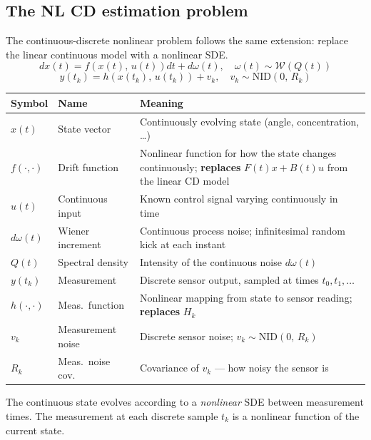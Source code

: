 \documentclass[12pt, a4paper]{article}
\begin{document}
\subsection*{The NL CD estimation problem}

The continuous-discrete nonlinear problem follows the same extension:
replace the linear continuous model with a nonlinear SDE.
\[
  dx(t) = f\!\left(x(t),\, u(t)\right) dt + d\omega(t),
  \quad \omega(t) \sim \mathcal{W}(Q(t))
\]
\[
  y(t_k) = h\!\left(x(t_k),\, u(t_k)\right) + v_k,
  \quad v_k \sim \mathrm{NID}(0,\, R_k)
\]

\begin{center}
\renewcommand{\arraystretch}{1.4}
\begin{tabular}{p{1.8cm} p{3.2cm} p{7.5cm}}
  \toprule
  \textbf{Symbol} & \textbf{Name} & \textbf{Meaning} \\
  \midrule
  $x(t)$  & State vector        & Continuously evolving state (angle, concentration, \ldots) \\
  $f(\cdot,\cdot)$ & Drift function & Nonlinear function for how the state changes continuously; \textbf{replaces} $F(t)x + B(t)u$ from the linear CD model \\
  $u(t)$  & Continuous input    & Known control signal varying continuously in time \\
  $d\omega(t)$ & Wiener increment & Continuous process noise; infinitesimal random kick at each instant \\
  $Q(t)$  & Spectral density    & Intensity of the continuous noise $d\omega(t)$ \\
  \midrule
  $y(t_k)$ & Measurement        & Discrete sensor output, sampled at times $t_0, t_1, \ldots$ \\
  $h(\cdot,\cdot)$ & Meas.\ function & Nonlinear mapping from state to sensor reading; \textbf{replaces} $H_k$ \\
  $v_k$   & Measurement noise   & Discrete sensor noise; $v_k \sim \mathrm{NID}(0,\,R_k)$ \\
  $R_k$   & Meas.\ noise cov.   & Covariance of $v_k$ --- how noisy the sensor is \\
  \bottomrule
\end{tabular}
\end{center}

The continuous state evolves according to a \emph{nonlinear} SDE
between measurement times.
The measurement at each discrete sample $t_k$ is a nonlinear
function of the current state.
\end{document}
